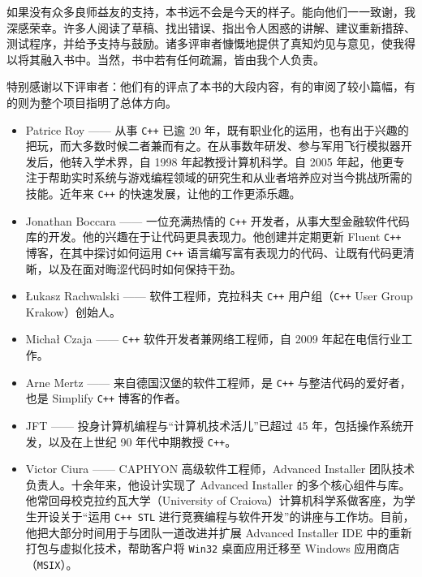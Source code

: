 如果没有众多良师益友的支持，本书远不会是今天的样子。能向他们一一致谢，我深感荣幸。许多人阅读了草稿、找出错误、指出令人困惑的讲解、建议重新措辞、测试程序，并给予支持与鼓励。诸多评审者慷慨地提供了真知灼见与意见，使我得以将其融入书中。当然，书中若有任何疏漏，皆由我个人负责。

特别感谢以下评审者：他们有的评点了本书的大段内容，有的审阅了较小篇幅，有的则为整个项目指明了总体方向。

\begin{itemize}
\item Patrice Roy —— 从事 \texttt{C++} 已逾 20 年，既有职业化的运用，也有出于兴趣的把玩，而大多数时候二者兼而有之。在从事数年研发、参与军用飞行模拟器开发后，他转入学术界，自 1998 年起教授计算机科学。自 2005 年起，他更专注于帮助实时系统与游戏编程领域的研究生和从业者培养应对当今挑战所需的技能。近年来 \texttt{C++} 的快速发展，让他的工作更添乐趣。

\item Jonathan Boccara —— 一位充满热情的 \texttt{C++} 开发者，从事大型金融软件代码库的开发。他的兴趣在于让代码更具表现力。他创建并定期更新 Fluent \texttt{C++} 博客，在其中探讨如何运用 \texttt{C++} 语言编写富有表现力的代码、让既有代码更清晰，以及在面对晦涩代码时如何保持干劲。

\item Łukasz Rachwalski —— 软件工程师，克拉科夫 \texttt{C++} 用户组（\texttt{C++} User Group Krakow）创始人。

\item Michał Czaja —— \texttt{C++} 软件开发者兼网络工程师，自 2009 年起在电信行业工作。

\item Arne Mertz —— 来自德国汉堡的软件工程师，是 \texttt{C++} 与整洁代码的爱好者，也是 Simplify \texttt{C++} 博客的作者。

\item JFT —— 投身计算机编程与“计算机技术活儿”已超过 45 年，包括操作系统开发，以及在上世纪 90 年代中期教授 \texttt{C++}。

\item Victor Ciura —— CAPHYON 高级软件工程师，Advanced Installer 团队技术负责人。十余年来，他设计实现了 Advanced Installer 的多个核心组件与库。他常回母校克拉约瓦大学（University of Craiova）计算机科学系做客座，为学生开设关于“运用 \texttt{C++ STL} 进行竞赛编程与软件开发”的讲座与工作坊。目前，他把大部分时间用于与团队一道改进并扩展 Advanced Installer IDE 中的重新打包与虚拟化技术，帮助客户将 \texttt{Win32} 桌面应用迁移至 Windows 应用商店（\texttt{MSIX}）。


\end{itemize}
